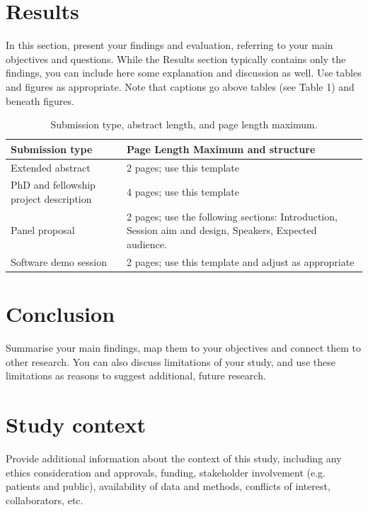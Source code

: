 \documentclass[11pt]{article}
\begin{document}
\section{Results}
In this section, present your findings and evaluation, referring to your main objectives and questions. While the Results section typically contains only the findings, you can include here some explanation and discussion as well. Use tables and figures as appropriate. Note that captions go above tables (see Table 1) and beneath figures. 

\begin{table}[h!]

\caption{Submission type, abstract length, and page length maximum.}
\label{sub-type}
\begin{tabular}{ |p{6cm}|p{8cm}| } 
 \hline
 \textbf{Submission type} & \textbf{Page Length Maximum and structure}  \\ 
 \hline
Extended abstract  & 2 pages; use this template \\
 \hline
 PhD and fellowship project description & 4 pages; use this template \\
 \hline
 Panel proposal & 2 pages; use the following sections: Introduction, Session aim and design, Speakers, Expected audience. \\
 \hline
 Software demo session & 2 pages; use this template and adjust as appropriate \\
 \hline
\end{tabular}
\end{table}


\section{Conclusion}
Summarise your main findings, map them to your objectives and connect them to other research. You can also discuss limitations of your study, and use these limitations as reasons to suggest additional, future research.

\section{Study context}
Provide additional information about the context of this study, including any ethics consideration and approvals, funding, stakeholder involvement (e.g. patients and public), availability of data and methods, conflicts of interest, collaborators, etc.



\end{document}
